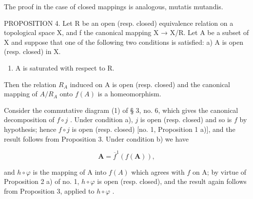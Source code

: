 The proof in the case of closed mappings is analogous, mutatis mutandis.

PROPOSITION 4. Let R be an open (resp. closed) equivalence relation on a topological space X, and f the canonical mapping X → X/R. Let A be a subset of X and suppose that one of the following two conditions is satisfied: a) A is open (resp. closed) in X.

\begin{enumerate}
\def\labelenumi{\alph{enumi})}
\setcounter{enumi}{1}
\tightlist
\item
  A is saturated with respect to R.
\end{enumerate}

Then the relation \(R_{A}\) induced on A is open (resp. closed) and the canonical mapping of \(A/R_{A}\) onto \(f(A)\) is a homeomorphism.

Consider the commutative diagram (1) of § 3, no. 6, which gives the canonical decomposition of \(f \circ j\) . Under condition a), \(j\) is open (resp. closed) and so is \(f\) by hypothesis; hence \(f \circ j\) is open (resp. closed) {[}no. 1, Proposition 1 a){]}, and the result follows from Proposition 3. Under condition b) we have

\[
\mathbf {A} = \overline {{{f}}} ^ {1} (f (\mathbf {A})),
\]

and \(h \circ \varphi\) is the mapping of A into \(f(A)\) which agrees with \(f\) on A; by virtue of Proposition 2 a) of no. 1, \(h \circ \varphi\) is open (resp. closed), and the result again follows from Proposition 3, applied to \(h \circ \varphi\) .

